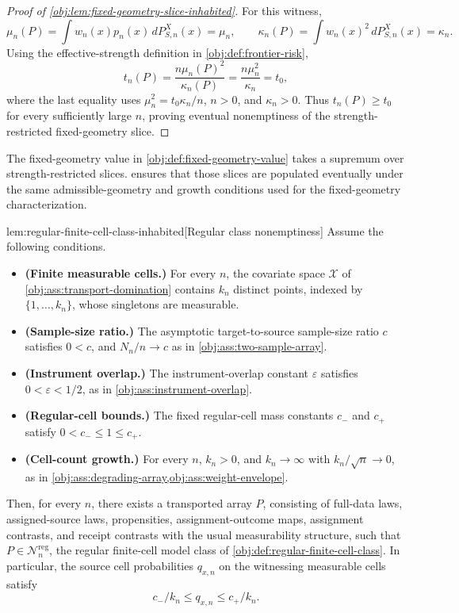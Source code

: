 \documentclass[11pt]{article}
\begin{document}
\begin{proof}[Proof of \cref{obj:lem:fixed-geometry-slice-inhabited}]
For this witness,
\[
\mu_n(P)=\int w_n(x)p_n(x)\,dP_{S,n}^X(x)=\mu_n,
\qquad
\kappa_n(P)=\int w_n(x)^2\,dP_{S,n}^X(x)=\kappa_n.
\]
Using the effective-strength definition in \cref{obj:def:frontier-risk},
\[
t_n(P)
=
\frac{n\mu_n(P)^2}{\kappa_n(P)}
=
\frac{n\mu_n^2}{\kappa_n}
=
t_0,
\]
where the last equality uses \(\mu_n^2=t_0\kappa_n/n\), \(n>0\), and \(\kappa_n>0\). Thus \(t_n(P)\ge t_0\) for every sufficiently large \(n\), proving eventual nonemptiness of the strength-restricted fixed-geometry slice. %
\end{proof}

The fixed-geometry value in \cref{obj:def:fixed-geometry-value} takes a supremum over strength-restricted slices.  ensures that those slices are populated eventually under the same admissible-geometry and growth conditions used for the fixed-geometry characterization.

\begin{lemmav}{lem:regular-finite-cell-class-inhabited}[Regular class nonemptiness]
Assume the following conditions.
\begin{itemize}
\item \textbf{(Finite measurable cells.)} For every \(n\), the covariate space \(\mathcal X\) of \cref{obj:ass:transport-domination} contains \(k_n\) distinct points, indexed by \(\{1,\ldots,k_n\}\), whose singletons are measurable.
\item \textbf{(Sample-size ratio.)} The asymptotic target-to-source sample-size ratio \(c\) satisfies \(0<c\), and \(N_n/n\to c\) as in \cref{obj:ass:two-sample-array}.
\item \textbf{(Instrument overlap.)} The instrument-overlap constant \(\varepsilon\) satisfies \(0<\varepsilon<1/2\), as in \cref{obj:ass:instrument-overlap}.
\item \textbf{(Regular-cell bounds.)} The fixed regular-cell mass constants \(c_-\) and \(c_+\) satisfy \(0<c_-\le 1\le c_+\).
\item \textbf{(Cell-count growth.)} For every \(n\), \(k_n>0\), and \(k_n\to\infty\) with \(k_n/\sqrt n\to 0\), as in \cref{obj:ass:degrading-array,obj:ass:weight-envelope}.
\end{itemize}
Then, for every \(n\), there exists a transported array \(P\), consisting of full-data laws, assigned-source laws, propensities, assignment-outcome maps, assignment contrasts, and receipt contrasts with the usual measurability structure, such that \(P\in\mathcal N_n^{\mathrm{reg}}\), the regular finite-cell model class of \cref{obj:def:regular-finite-cell-class}. In particular, the source cell probabilities \(q_{x,n}\) on the witnessing measurable cells satisfy
\[
c_-/k_n\le q_{x,n}\le c_+/k_n .
\]
\end{lemmav}
\end{document}
